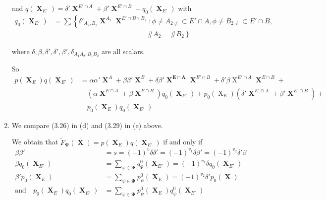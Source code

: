 \documentclass[a4paper,12pt]{article}
\DeclareMathOperator{\x}{\mathrm{X}}
\theoremstyle{definition}
\theoremstyle{underlinethm}
\theoremstyle{definition}
\begin{document}
\begin{enumerate}[label=(\alph*)]
and $q(\boldsymbol{\x}_{E'}) = \delta' \boldsymbol{\x}^{E' \cap A} + \beta' \boldsymbol{\x}^{E' \cap B} + q_{0}(\boldsymbol{\x}_{E'})$ with
\begin{align*}
q_{0}(\boldsymbol{\x}_{E'}) &= \sum \left\{\delta'_{A_{2}, B_{2}} \boldsymbol{\x}^{A_{2}} \boldsymbol{\x}^{E' \cap B \smallsetminus B_{2}} : \phi \neq A_{2 \neq} \subset E' \cap A, \phi \neq B_{2 \neq} \subset E' \cap B,\right.\\ 
 &\left.\hspace{4cm}\qquad\qquad\# A_{2} = \# B_{2}\right\}\tag{3.28}
\end{align*}

where $\delta, \beta, \delta', \delta{'}, \beta', \delta_{A_{1}A_{2}, B_{1}B_{2}}$ are all scalars.

So
\begin{align*}
p(\boldsymbol{\x}_{E}) q (\boldsymbol{\x}_{E'}) &= \alpha \alpha' \boldsymbol{\x}^{A} + \beta \beta' \boldsymbol{\x}^{B} + \delta \beta' \boldsymbol{\x^{E \cap A}} \boldsymbol{\x}^{E' \cap B} + \delta'\beta \x^{E' \cap A} \boldsymbol{\x}^{E \cap B} +\\
&\quad(\alpha \boldsymbol{\x}^{E \cap A} + \beta \boldsymbol{\x}^{E \cap B}) q_{0}(\boldsymbol{\x}_{E'}) + p_{0}(\x_{E}) (\delta' \boldsymbol{\x}^{E' \cap A} +\beta' \boldsymbol{\x}^{E' \cap B}) +\\
&\quad p_{0}(\boldsymbol{\x}_{E}) q_{0}(\boldsymbol{\x}_{E'})\tag{3.29}
\end{align*}
 
\item We compare (3.26) in (d) and (3.29) in (e) above. 

We obtain that $\widetilde{F}_{\boldsymbol\Psi}(\boldsymbol{\x}) = p(\boldsymbol{\x}_{E}) q(\boldsymbol{\x}_{E'})$ if and only if
\begin{align*}
\beta \beta' &= s = (-1)^{v} \delta \delta' = (-1)^{v_{1}} \delta \beta' = (-1)^{v_{2}} \delta' \beta\tag{3.30}\label{eq-3.30}\\
\beta q_{0}(\boldsymbol{\x}_{E'}) &= \sum_{\psi \in \boldsymbol{\Psi}} q_{\Psi}^{0}(\boldsymbol{\x}_{E'}) = (-1)^{v_{1}} \delta q_{0} (\boldsymbol{\x}_{E'})\tag{3.31}\label{eq-3.31}\\
\beta' p_{0}(\boldsymbol{\x}_{E}) &= \sum_{\psi \in \boldsymbol{\Psi}} p^{0}_{\psi} (\boldsymbol{\x}_{E}) = (-1)^{v_{2}} \delta' p_{0} (\boldsymbol{\x})\tag{3.32}\label{eq-3.32}\\
 \text{and}\quad p_{0}(\boldsymbol{\x}_{E}) q_{0}(\boldsymbol{\x}_{E'}) &= \sum_{\psi \in \boldsymbol{\Psi}} p^{0}_{\psi} (\boldsymbol{\x}_{E}) q^{0}_{\psi} (\boldsymbol{\x}_{E'}) \tag{3.33}\label{eq-3.33}
\end{align*}
 

\end{enumerate}
\end{document}

